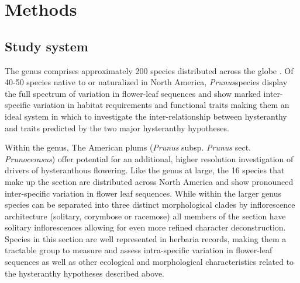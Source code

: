 \documentclass{article}\usepackage[]{graphicx}\usepackage[]{color}
\begin{document}


\section*{Methods}
\subsection{Study system}
\noindent The genus  comprises approximately 200 species distributed across the globe \citep{}. Of 40-50 species native to or naturalized in North America, \textit{Prunus}species display the full spectrum of variation in flower-leaf sequences \citep{} and show marked inter-specific variation in habitat requirements and functional traits making them an ideal system in which to investigate the inter-relationship between hysteranthy and traits predicted by the two major hysteranthy hypotheses.

\noindent Within the genus, The American plums (\textit{Prunus} subsp. \textit{Prunus} sect. \textit{Prunocerasus}) offer potential for an additional, higher resolution investigation of drivers of hysteranthous flowering. Like the genus at large, the 16 species that make up the section are distributed across North America and show pronounced inter-specific variation in flower leaf sequences. While within the larger genus species can be separated into three distinct morphological clades by inflorescence architecture (solitary, corymbose or racemose) all members of the section have solitary inflorescences \citep{} allowing for even more refined character deconstruction. Species in this section are well represented in herbaria records, making them a tractable group to measure and assess intra-specific variation in flower-leaf sequences as well as other ecological and morphological characteristics related to the hysteranthy hypotheses described above. 
\end{document}
